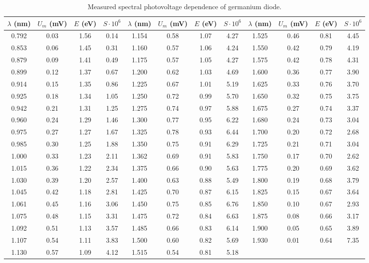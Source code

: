 \documentclass[a4paper,11pt]{article}
\begin{document}
\begin{table}[h]
    \scriptsize
    \centering
    \begin{tabular}{| c c c c | c c c c | c c c c | }
        \hline
        $ \lambda $ (nm) & $ U_m $ (mV) & $ E $ (eV) & $ S \cdot 10^{6} $ & $ \lambda $ (nm) & $ U_m $ (mV) & $ E $ (eV) & $ S \cdot 10^{6} $ & $ \lambda $ (nm) & $ U_m $ (mV) & $ E $ (eV) & $ S \cdot 10^{6} $ \\
        \hline
        0.792 & 0.03 & 1.56 & 0.14 & 1.154 & 0.58 & 1.07 & 4.27 & 1.525 & 0.46 & 0.81 & 4.45 \\
        0.853 & 0.06 & 1.45 & 0.31 & 1.160 & 0.57 & 1.06 & 4.24 & 1.550 & 0.42 & 0.79 & 4.19 \\
        0.879 & 0.09 & 1.41 & 0.49 & 1.175 & 0.57 & 1.05 & 4.27 & 1.575 & 0.42 & 0.78 & 4.31 \\
        0.899 & 0.12 & 1.37 & 0.67 & 1.200 & 0.62 & 1.03 & 4.69 & 1.600 & 0.36 & 0.77 & 3.90 \\
        0.914 & 0.15 & 1.35 & 0.86 & 1.225 & 0.67 & 1.01 & 5.19 & 1.625 & 0.33 & 0.76 & 3.70 \\
        0.925 & 0.18 & 1.34 & 1.05 & 1.250 & 0.72 & 0.99 & 5.70 & 1.650 & 0.32 & 0.75 & 3.75 \\
        0.942 & 0.21 & 1.31 & 1.25 & 1.275 & 0.74 & 0.97 & 5.88 & 1.675 & 0.27 & 0.74 & 3.37 \\
        0.960 & 0.24 & 1.29 & 1.46 & 1.300 & 0.77 & 0.95 & 6.22 & 1.680 & 0.24 & 0.73 & 3.04 \\
        0.975 & 0.27 & 1.27 & 1.67 & 1.325 & 0.78 & 0.93 & 6.44 & 1.700 & 0.20 & 0.72 & 2.68 \\
        0.985 & 0.30 & 1.25 & 1.88 & 1.350 & 0.75 & 0.91 & 6.29 & 1.725 & 0.21 & 0.71 & 3.04 \\
        1.000 & 0.33 & 1.23 & 2.11 & 1.362 & 0.69 & 0.91 & 5.83 & 1.750 & 0.17 & 0.70 & 2.62 \\
        1.015 & 0.36 & 1.22 & 2.34 & 1.375 & 0.66 & 0.90 & 5.63 & 1.775 & 0.20 & 0.69 & 3.62 \\
        1.030 & 0.39 & 1.20 & 2.57 & 1.400 & 0.63 & 0.88 & 5.49 & 1.800 & 0.19 & 0.68 & 3.79 \\
        1.045 & 0.42 & 1.18 & 2.81 & 1.425 & 0.70 & 0.87 & 6.15 & 1.825 & 0.15 & 0.67 & 3.64 \\
        1.061 & 0.45 & 1.16 & 3.06 & 1.450 & 0.75 & 0.85 & 6.76 & 1.850 & 0.10 & 0.67 & 2.93 \\
        1.075 & 0.48 & 1.15 & 3.31 & 1.475 & 0.72 & 0.84 & 6.63 & 1.875 & 0.08 & 0.66 & 3.17 \\
        1.092 & 0.51 & 1.13 & 3.57 & 1.485 & 0.66 & 0.83 & 6.14 & 1.900 & 0.05 & 0.65 & 3.89 \\
        1.107 & 0.54 & 1.11 & 3.83 & 1.500 & 0.60 & 0.82 & 5.69 & 1.930 & 0.01 & 0.64 & 7.35 \\
        1.130 & 0.57 & 1.09 & 4.12 & 1.515 & 0.54 & 0.81 & 5.18 &       &      &      &      \\
        \hline
    \end{tabular}
    \caption{Measured spectral photovoltage dependence of germanium diode.}
\end{table}
\end{document}
